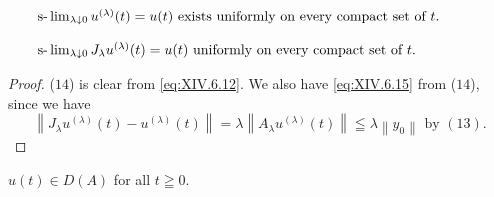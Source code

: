 \begin{corollaryu} 
\begin{equation}
\label{eq:XIV.6.14}
\begin{minipage}{0.92\linewidth}
\everymath{}\let\limits\nolimits
$\slim_{\lambda \downarrow 0} u^{(\lambda)}(t) = u(t)$ exists uniformly on every compact set of $t.$
\end{minipage}
\end{equation}
\end{corollaryu}

\begin{equation}
\label{eq:XIV.6.15}
\begin{minipage}{0.92\linewidth}
\everymath{}\let\limits\nolimits
$\slim _{\lambda \downarrow 0} J _{\lambda} u ^{(\lambda)} (t) = u (t)$ uniformly on every compact set of $t.$
\end{minipage}
\end{equation}

\begin{proof}
 ($14$) is clear from \eqref{eq:XIV.6.12}. We also have \eqref{eq:XIV.6.15} from ($14$), since we have 
\[
\left\| J _{\lambda} u ^{(\lambda)} (t) - u ^{(\lambda)} (t) \right\| = \lambda \left\| A _{\lambda} u ^{(\lambda)} (t) \right\| \leqq \lambda \left\| y _{0} \right\| \text{ by } (1 3). \]
\end{proof}

\begin{lemma}\label{lem:XIV.6.Lemma.4} $u(t) \in D(A)$ for all $t \geqq 0$. 
\end{lemma}

